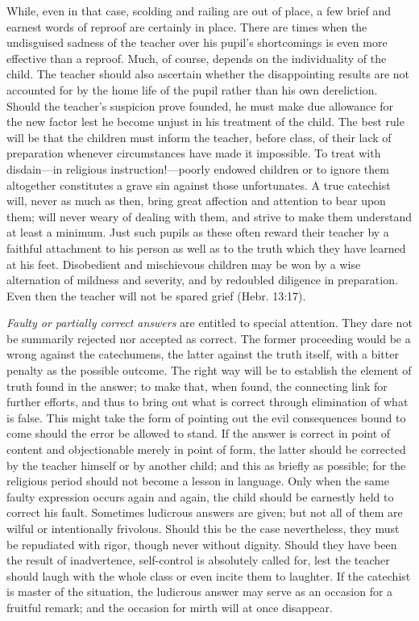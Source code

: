 While, even in that case, scolding and railing are out of place, a few brief and earnest words of reproof are certainly in place. There are times when the undisguised sadness of the teacher over his pupil’s shortcomings is even more effective than a reproof. Much, of course, depends on the individuality of the child. The teacher should also ascertain whether the disappointing results are not accounted for by the home life of the pupil rather than his own dereliction. Should the teacher’s suspicion prove founded, he must make due allowance for the new factor lest he become unjust in his treatment of the child. The best rule will be that the children must inform the teacher, before class, of their lack of preparation whenever circumstances have made it impossible. To treat with disdain—in religious instruction!—poorly endowed children or to ignore them altogether constitutes a grave sin against those unfortunates. A true catechist will, never as much as then, bring great affection and attention to bear upon them; will never weary of dealing with them, and strive to make them understand at least a minimum. Just such pupils as these often reward their teacher by a faithful attachment to his person as well as to the truth which they have learned at his feet. Disobedient and mischievous children may be won by a wise alternation of mildness and severity, and by redoubled diligence in preparation. Even then the teacher will not be spared grief (Hebr. 13:17).

\emph{Faulty or partially correct answers} are entitled to special attention. They dare not be summarily rejected nor accepted as correct. The former proceeding would be a wrong against the catechumens, the latter against the truth itself, with a bitter penalty as the possible outcome. The right way will be to establish the element of truth found in the answer; to make that, when found, the connecting link for further efforts, and thus to bring out what is correct through elimination
of what is false. This might take the form of pointing out the evil consequences bound to come should the error be allowed to stand. If the answer is correct in point of content and objectionable merely in point of form, the latter should be corrected by the teacher himself or by another child; and this as briefly as possible; for the religious period should not become a lesson in language. Only when the same faulty expression occurs again and again, the child should be earnestly held to correct his fault. Sometimes ludicrous answers are given; but not all of them are wilful or intentionally frivolous. Should this be the case nevertheless, they must be repudiated with rigor, though never without dignity. Should they have been the result of inadvertence, self-control is absolutely called for, lest the teacher should laugh with the whole class or even incite them to laughter. If the catechist is master of the situation, the ludicrous answer may serve as an occasion for a fruitful remark; and the occasion for mirth will at once disappear.





